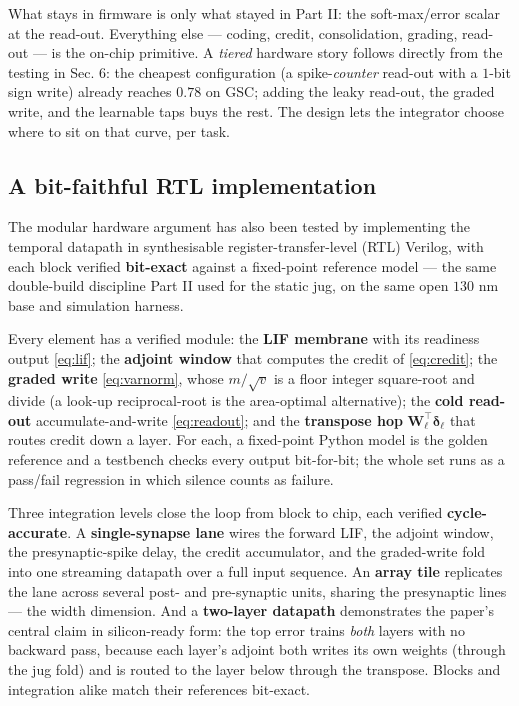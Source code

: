 \documentclass[11pt]{article}
\begin{document}
What stays in firmware is only what stayed in Part II: the
soft-max/error scalar at the read-out. Everything else --- coding,
credit, consolidation, grading, read-out --- is the on-chip primitive. A
\emph{tiered} hardware story follows directly from the testing in Sec.
6: the cheapest configuration (a spike-\emph{counter} read-out with a
\(1\)-bit sign write) already reaches \(0.78\) on GSC; adding the leaky
read-out, the graded write, and the learnable taps buys the rest. The
design lets the integrator choose where to sit on that curve, per task.

\hypertarget{sec:rtl}{%
\subsection{A bit-faithful RTL implementation}\label{sec:rtl}}

The modular hardware argument has also been tested by implementing the
temporal datapath in synthesisable register-transfer-level (RTL)
Verilog, with each block verified \textbf{bit-exact} against a
fixed-point reference model --- the same double-build discipline Part II
used for the static jug, on the same open \(130\) nm base and simulation
harness.

Every element has a verified module: the \textbf{LIF membrane} with its
readiness output \eqref{eq:lif}; the \textbf{adjoint window} that
computes the credit of \eqref{eq:credit}; the \textbf{graded write}
\eqref{eq:varnorm}, whose \(m/\sqrt{v}\) is a floor integer square-root
and divide (a look-up reciprocal-root is the area-optimal alternative);
the \textbf{cold read-out} accumulate-and-write \eqref{eq:readout}; and
the \textbf{transpose hop} \(\bm W_\ell^{\!\top}\bm\delta_\ell\) that
routes credit down a layer. For each, a fixed-point Python model is the
golden reference and a testbench checks every output bit-for-bit; the
whole set runs as a pass/fail regression in which silence counts as
failure.

Three integration levels close the loop from block to chip, each
verified \textbf{cycle-accurate}. A \textbf{single-synapse lane} wires
the forward LIF, the adjoint window, the presynaptic-spike delay, the
credit accumulator, and the graded-write fold into one streaming
datapath over a full input sequence. An \textbf{array tile} replicates
the lane across several post- and pre-synaptic units, sharing the
presynaptic lines --- the width dimension. And a \textbf{two-layer
datapath} demonstrates the paper's central claim in silicon-ready form:
the top error trains \emph{both} layers with no backward pass, because
each layer's adjoint both writes its own weights (through the jug fold)
and is routed to the layer below through the transpose. Blocks and
integration alike match their references bit-exact.
\end{document}
